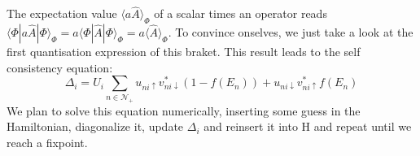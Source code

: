 \documentclass[../main.tex]{subfile}
\begin{document}
The expectation value $\langle a\hat{A}\rangle_{\Phi}$ of a scalar times an operator reads $\langle \Phi|a \hat{A}|\Phi\rangle_{\Phi} = a \langle \Phi|\hat{A}|\Phi\rangle_{\Phi} = a \langle \hat{A}\rangle_{\Phi}$. 
To convince onselves, we just take a look at the first quantisation expression of this braket. This result leads to the self consistency equation:
\begin{equation}\label{eq:SelfConsitentDelta}
    \Delta_i = U_i\sum_{n\in\mathcal{N}_+} u_{ni\uparrow} v_{ni\downarrow}^{\ast} \left(1-f(E_n)\right) + u_{ni\downarrow} v_{ni\uparrow}^{\ast}f(E_n)
\end{equation}
We plan to solve this equation numerically, inserting some guess in the Hamiltonian, diagonalize it, update $\Delta_i$ and reinsert it into H and repeat until we reach a fixpoint.\\
\end{document}
